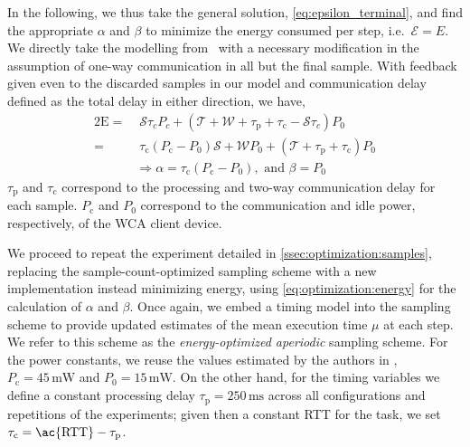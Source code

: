 In the following, we thus take the general solution, \cref{eq:epsilon_terminal}, and find the appropriate \( \alpha \) and \( \beta \) to minimize the energy consumed per step, i.e.\ \( \mathcal{E}=E \).
We directly take the modelling from~\cite{Moothedath2022Aperiodic} with a necessary modification in the  assumption of one-way communication in all but the final sample.
With feedback given even to the discarded samples in our model and communication delay defined as the total delay in either direction, we have, 
\begin{alignat}{2}
    \mathrm{E}=&\;\mathcal{S}\tau_cP_c+(\mathcal{T}+\mathcal{W}+\tau_\mathrm{p}+\tau_\mathrm{c}-\mathcal{S}\tau_c)P_0\nonumber\\
    =&\;\tau_{\text{c}}(P_{\text{c}} -P_0)\mathcal{S}+\mathcal{W}P_0+(\mathcal{T}+\tau_{\text{p}} +\tau_{\text{c}}) P_0\nonumber\\
&\Rightarrow \alpha=\tau_{\text{c}}(P_{\text{c}} -P_0),\text{ and }\beta=P_0 \label{eq:optimization:energy}
\end{alignat}
\( \tau_\text{p} \) and \( \tau_\text{c} \) correspond to the processing and two-way communication delay for each sample.
\( P_\text{c} \) and \( P_0 \) correspond to the communication and idle power, respectively, of the \ac{WCA} client device.

We proceed to repeat the experiment detailed in \cref{ssec:optimization:samples}, replacing the sample-count-optimized sampling scheme with a new implementation instead minimizing energy, using \cref{eq:optimization:energy} for the calculation of \( \alpha \) and \( \beta \).
Once again, we embed a timing model into the sampling scheme to provide updated estimates of the mean execution time \( \mu \) at each step.
We refer to this scheme as the \emph{energy-optimized aperiodic} sampling scheme.
For the power constants, we reuse the values estimated by the authors in \textcite{Moothedath2022EnergyEfficient}, \( P_\text{c} = 45\,\si{\milli\watt} \) and \( P_\text{0} = 15\,\si{\milli\watt} \).
On the other hand, for the timing variables we define a constant processing delay \( \tau_\text{p} = 250\,\si{\milli\second} \) across all configurations and repetitions of the experiments; given then a constant \ac{RTT} for the task, we set \( \tau_\text{c} = \text{\ac{RTT}} - \tau_\text{p} \).

